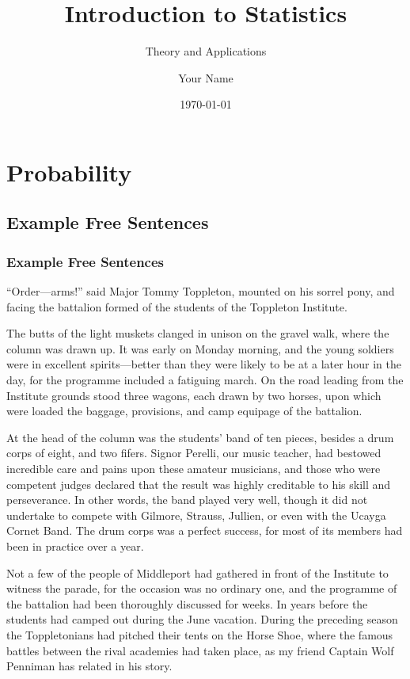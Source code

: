 \documentclass[11pt,a4paper]{book}
\title{Introduction to Statistics}
\subtitle{Theory and Applications}
\author{Your Name}
\date{\today}
\begin{document}
\maketitle
\tableofcontents

\chapter{Probability}

\section{Example Free Sentences}

\subsection{Example Free Sentences}

“Order—arms!” said Major Tommy Toppleton, mounted on his sorrel pony, and facing the battalion formed of the students of the Toppleton Institute.

The butts of the light muskets clanged in unison on the gravel walk, where the column was drawn up. It was early on Monday morning, and the young soldiers were in excellent spirits—better than they were likely to be at a later hour in the day, for the programme included a fatiguing march. On the road leading from the Institute grounds stood three wagons, each drawn by two horses, upon which were loaded the baggage, provisions, and camp equipage of the battalion.

At the head of the column was the students’ band of ten pieces, besides a drum corps of eight, and two fifers. Signor Perelli, our music teacher, had bestowed incredible care and pains upon these amateur musicians, and those who were competent judges declared that the result was highly creditable to his skill and perseverance. In other words, the band played very well, though it did not undertake to compete with Gilmore, Strauss, Jullien, or even with the Ucayga Cornet Band. The drum corps was a perfect success, for most of its members had been in practice over a year.

Not a few of the people of Middleport had gathered in front of the Institute to witness the parade, for the occasion was no ordinary one, and the programme of the battalion had been thoroughly discussed for weeks. In years before the students had camped out during the June vacation. During the preceding season the Toppletonians had pitched their tents on the Horse Shoe, where the famous battles between the rival academies had taken place, as my friend Captain Wolf Penniman has related in his story.
\end{document}
